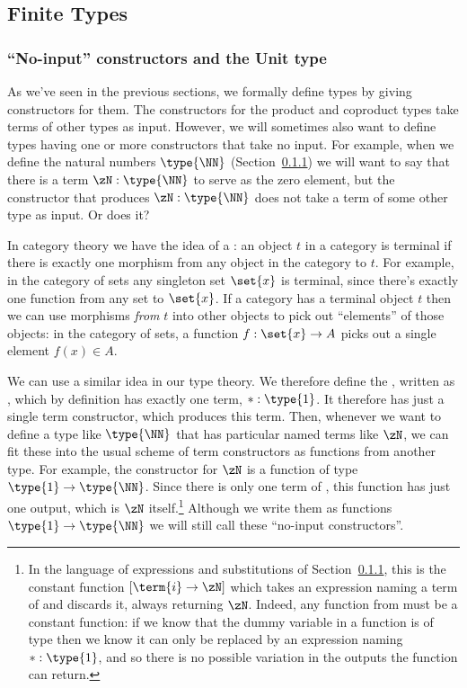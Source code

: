 \subsection{Finite Types}
\label{sec:SimpleTT-FiniteTypes}

\subsubsection{``No-input'' constructors and the Unit type}

As we've seen in the previous sections, we formally define types by giving constructors for them.  The constructors for the product and coproduct types take terms of other types as input.  However, we will sometimes also want to define types having one or more constructors that take no input.  For example, when we define the natural numbers $\type{\NN}$ (Section~\ref{}) we will want to say that there is a term $\zN:\type{\NN}$ to serve as the zero element, but the constructor that produces $\zN:\type{\NN}$ does not take a term of some other type as input.  Or does it?

In category theory we have the idea of a : an object $t$ in a category is terminal if there is exactly one morphism from any object in the category to $t$.  For example, in the category of sets any singleton set $\set{x}$ is terminal, since there's exactly one function from any set to $\set{x}$.  If a category has a terminal object $t$ then we can use morphisms \emph{from} $t$ into other objects to pick out ``elements'' of those objects: in the category of sets, a function $f: \set{x} \to A$ picks out a single element $f(x) \in A$.  

We can use a similar idea in our type theory.  We therefore define the , written as , which by definition has exactly one term, $\ast:\type{1}$.  It therefore has just a single term constructor, which produces this term.
Then, whenever we want to define a type like $\type{\NN}$ that has particular named terms like $\zN$, we can fit these into the usual scheme of term constructors as functions from another type.  For example, the constructor for $\zN$ is a function of type $\type{1} \to \type{\NN}$.  Since there is only one term of , this function has just one output, which is $\zN$ itself.\footnote{
In the language of expressions and substitutions of Section~\ref{}, this is the constant function $[\term{i} \to \zN]$ which takes an expression naming a term of  and discards it, always returning $\zN$.  Indeed, any function from  must be a constant function: if we know that the dummy variable in a function is of type  then we know it can only be replaced by an expression naming $\ast:\type{1}$, and so there is no possible variation in the outputs the function can return.
}  Although we write them as functions $\type{1} \to \type{\NN}$ we will still call these ``no-input constructors''.


